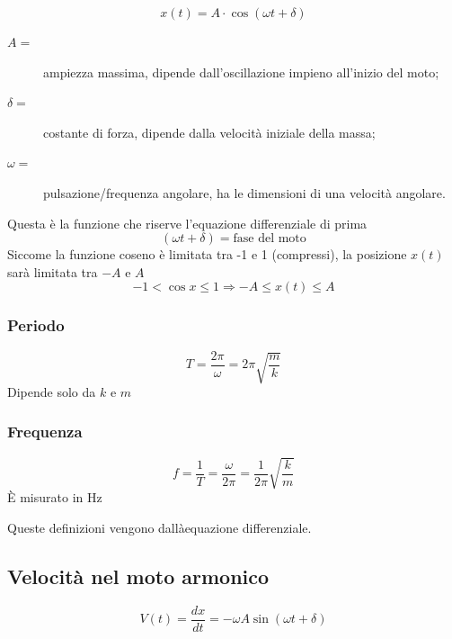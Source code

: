 \documentclass{book}
\begin{document}
\begin{equation}
  \label{eq:leggdelmotarmo}
  x(t)=A\cdot \cos(\omega t+\delta)
\end{equation}
\begin{description}
 \item[$A=$] ampiezza massima, dipende dall'oscillazione impieno all'inizio del moto;
\item[$\delta=$] costante di forza, dipende dalla velocità iniziale della massa;
\item[$\omega=$] pulsazione/frequenza angolare, ha le dimensioni di una velocità angolare.
\end{description}
Questa è la funzione che riserve l'equazione differenziale di prima
\begin{equation}
  \label{eq:leggedelmotarmo2}
  (\omega t+\delta)=\text{fase del moto}
\end{equation}
Siccome la funzione coseno è limitata tra -1 e 1 (compressi), la posizione $x(t)$ sarà limitata tra $-A$ e $A$
\begin{equation*}
  -1<\cos x \leq 1 \Longrightarrow -A\leq x(t)\leq A
\end{equation*}
\begin{multicols}{2}
  \subsubsection{Periodo}
  \label{sec:periodoarm}
  \begin{equation*}
    T=\frac{2\pi}{\omega} = 2\pi\sqrt{\frac{m}{k}}
  \end{equation*}
  Dipende solo da $k$ e $m$
  \subsubsection{Frequenza}
  \label{sec:freqarm}
  \begin{equation*}
    f=\frac{1}{T}=\frac{\omega}{2\pi}=\frac{1}{2\pi}\sqrt{\frac{k}{m}}
  \end{equation*}
  È misurato in Hz
\end{multicols}
Queste definizioni vengono dallàequazione differenziale.

\subsection{Velocità nel moto armonico}
\label{sec:velnelmotarmon}
\begin{equation}
  \label{eq:velnelmotarmon}
  V(t)=\frac{dx}{dt}=-\omega A\sin (\omega t +\delta)
\end{equation}
\end{document}
